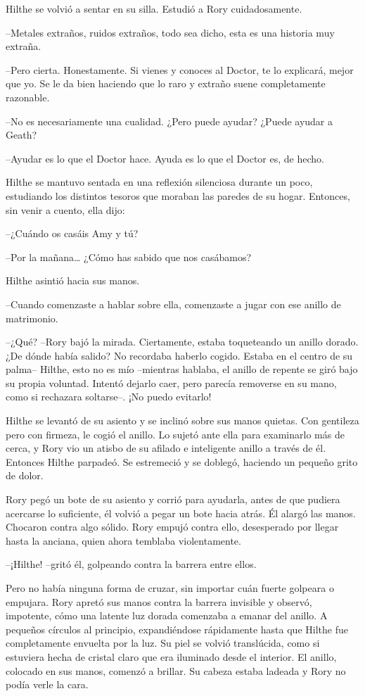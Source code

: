 {Hilthe se volvió a sentar en su silla. Estudió a Rory cuidadosamente.}

{--Metales extraños, ruidos extraños, todo sea dicho, esta es una
historia muy extraña.}

{--Pero cierta. Honestamente. Si vienes y conoces al Doctor, te lo
	explicará, mejor que yo. Se le da bien haciendo que lo raro y extraño
suene completamente razonable.}

{--No es necesariamente una cualidad. ¿Pero puede ayudar? ¿Puede
ayudar a Geath?}

{--Ayudar es lo que el Doctor hace. Ayuda es lo que el Doctor es, de
hecho.}

{Hilthe se mantuvo sentada en una reflexión silenciosa durante un poco,
	estudiando los distintos tesoros que moraban las paredes de su hogar.
Entonces, sin venir a cuento, ella dijo:}

{--¿Cuándo os casáis Amy y tú?}

{--Por la mañana\ldots{} ¿Cómo has sabido que nos casábamos?}

{Hilthe asintió hacia sus manos.}

{--Cuando comenzaste a hablar sobre ella, comenzaste a jugar con ese
anillo de matrimonio.}

{--¿Qué? --Rory bajó la mirada. Ciertamente, estaba toqueteando un
	anillo dorado. ¿De dónde había salido? No recordaba haberlo cogido.
	Estaba en el centro de su palma-- Hilthe, esto no es mío --mientras
	hablaba, el anillo de repente se giró bajo su propia voluntad. Intentó
	dejarlo caer, pero parecía removerse en su mano, como si rechazara
soltarse--. ¡No puedo evitarlo!}

{Hilthe se levantó de su asiento y se inclinó sobre sus manos quietas.
	Con gentileza pero con firmeza, le cogió el anillo. Lo sujetó ante ella
	para examinarlo más de cerca, y Rory vio un atisbo de su afilado e
	inteligente anillo a través de él. Entonces Hilthe parpadeó. Se
estremeció y se doblegó, haciendo un pequeño grito de dolor.}

{Rory pegó un bote de su asiento y corrió para ayudarla, antes de que
	pudiera acercarse lo suficiente, él volvió a pegar un bote hacia atrás.
	Él alargó las manos. Chocaron contra algo sólido. Rory empujó contra
	ello, desesperado por llegar hasta la anciana, quien ahora temblaba
violentamente.}

{--¡Hilthe! --gritó él, golpeando contra la barrera entre ellos.}

{Pero no había ninguna forma de cruzar, sin importar cuán fuerte
	golpeara o empujara. Rory apretó sus manos contra la barrera invisible y
	observó, impotente, cómo una latente luz dorada comenzaba a emanar del
	anillo. A pequeños círculos al principio, expandiéndose rápidamente
	hasta que Hilthe fue completamente envuelta por la luz. Su piel se
	volvió translúcida, como si estuviera hecha de cristal claro que era
	iluminado desde el interior. El anillo, colocado en sus manos, comenzó a
brillar. Su cabeza estaba ladeada y Rory no podía verle la cara.}

